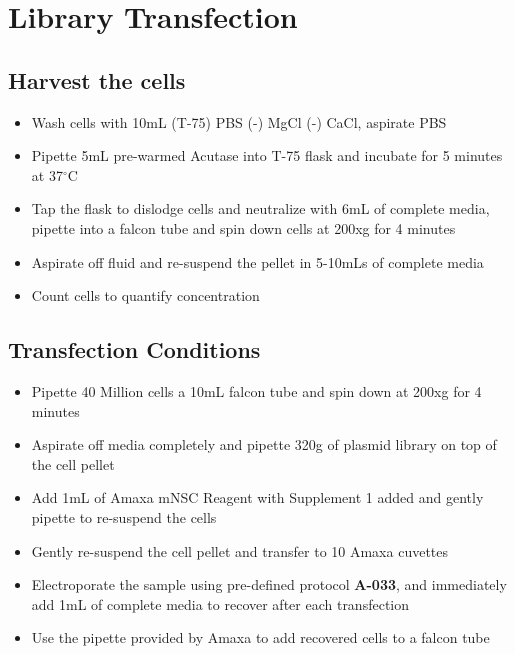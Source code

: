 \documentclass[a4paper]{article}
\begin{document}
\section{Library Transfection}    
	\subsection{Harvest the cells}
    	\begin{itemize}
			
            \item Wash cells with 10mL (T-75) PBS (-) MgCl (-) CaCl, aspirate PBS
            
            \item Pipette 5mL pre-warmed Acutase into T-75 flask and incubate for 5 minutes at 37$^{\circ}$C
            
            \item Tap the flask to dislodge cells and neutralize with 6mL of complete media, pipette into a falcon tube and spin down cells at 200xg for 4 minutes
            
            \item Aspirate off fluid and re-suspend the pellet in 5-10mLs of complete media
        
        	\item Count cells to quantify concentration
            
        \end{itemize}
	\subsection{Transfection Conditions} \label{TransfectionConditions}
    	\begin{itemize}
			
            \item Pipette 40 Million cells a 10mL falcon tube and spin down at 200xg for 4 minutes
            
            \item Aspirate off media completely and pipette 320\textmu g of plasmid library on top of the cell pellet

            \item Add 1mL of Amaxa mNSC Reagent with Supplement 1 added and gently pipette to re-suspend the cells
                        
            \item Gently re-suspend the cell pellet and transfer to 10 Amaxa cuvettes
        
			\item Electroporate the sample using pre-defined protocol \textbf{A-033}, and immediately add 1mL of complete media to recover after each transfection
            
            \item Use the pipette provided by Amaxa to add recovered cells to a falcon tube
            
        \end{itemize}
\end{document}
